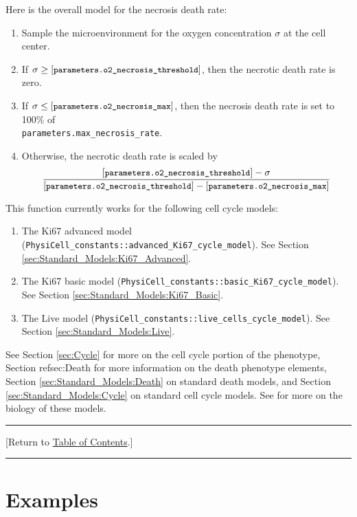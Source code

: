 \documentclass[12pt]{article}
\newcommand{\beq}{\begin{equation}}
\newcommand{\eeq}{\end{equation}}
\renewcommand{\v}{\verb}
\renewcommand{\tt}[1]{{\small \left[\texttt{#1}\right] }}
\newcommand{\TOClink}{\begin{center}\hrule\vskip-10pt\phantom{.}\hfill[Return to \hyperlink{TOC}{Table of Contents}.]\hfill\phantom{.}\vskip3pt\hrule\end{center}}
\begin{document}
Here is the overall model for the necrosis death rate: 
\begin{enumerate}
\item 
Sample the microenvironment for the oxygen concentration 
$\sigma$ at the 
cell center. 
\item 
If $\sigma \ge \tt{parameters.o2\_necrosis\_threshold}$, 
then the necrotic death rate is zero. 

\item 
If $\sigma \le \tt{parameters.o2\_necrosis\_max}$, 
then the necrosis death rate is set to 100\% of \\
\v|parameters.max_necrosis_rate|. 

\item 
Otherwise, the necrotic death rate is scaled by 
\beq
\frac{ \tt{parameters.o2\_necrosis\_threshold} - \sigma }
{\tt{parameters.o2\_necrosis\_threshold} - \tt{parameters.o2\_necrosis\_max} }
\eeq
\end{enumerate}

This function currently works for the following 
cell cycle models: 

\begin{enumerate}
\item 
The Ki67 advanced model 
(\v|PhysiCell_constants::advanced_Ki67_cycle_model|). See 
Section \ref{sec:Standard_Models:Ki67_Advanced}. 

\item 
The Ki67 basic model 
(\v|PhysiCell_constants::basic_Ki67_cycle_model|). See 
Section \ref{sec:Standard_Models:Ki67_Basic}. 

\item 
The Live model 
(\v|PhysiCell_constants::live_cells_cycle_model|). See 
Section \ref{sec:Standard_Models:Live}. 
\end{enumerate}

See Section \ref{sec:Cycle} for more on the cell cycle portion 
of the phenotype, Section ref{sec:Death} for more information 
on the death phenotype elements, 
Section \ref{sec:Standard_Models:Death} on standard death models, and  
Section \ref{sec:Standard_Models:Cycle} on standard cell cycle models. 
See \cite{ref:PhysiCell} for more on the biology of these 
models. 

\TOClink 

\section{Examples}
\label{sec:Examples}
\end{document}
